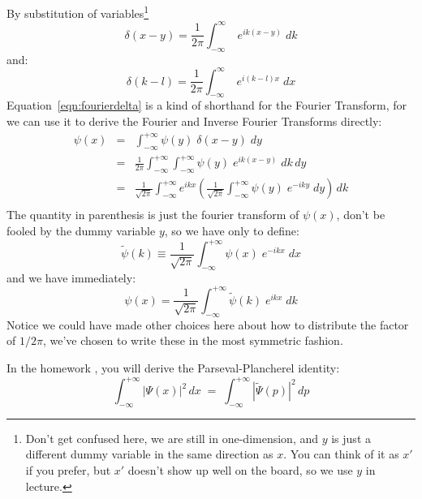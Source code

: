 \documentclass[12pt]{book}
\begin{document}
By substitution of variables\footnote{Don't get confused here, we are still in one-dimension, and $y$ is just a different dummy variable in the same direction as $x$.  You can think of it as $x'$ if you prefer, but $x'$ doesn't show up well on the board, so we use $y$ in lecture.}
$$
\delta(x-y) = \frac{1}{2\pi} \int_{-\infty}^{\infty} \; e^{ik(x-y)} \; dk
$$
and:
$$
\delta(k-l) = \frac{1}{2\pi} \int_{-\infty}^{\infty} \; e^{i(k-l)x} \; dx
$$
Equation~\ref{eqn:fourierdelta} is a kind of shorthand for the Fourier Transform, for we can use it to derive the Fourier and Inverse Fourier Transforms directly:
\begin{eqnarray*}
\psi(x) &=& \int_{-\infty}^{+\infty} \psi(y) \; \delta(x-y) \; dy \\
&=& \frac{1}{2\pi}\int_{-\infty}^{+\infty} \int_{-\infty}^{+\infty} \psi(y) \; e^{ik(x-y)} \; dk \, dy \\
&=& \frac{1}{\sqrt{2\pi}}\int_{-\infty}^{+\infty} e^{ikx} 
 \left( \frac{1}{\sqrt{2\pi}} \int_{-\infty}^{+\infty} \psi(y) \; e^{-iky} \; dy \right) \, dk \\
\end{eqnarray*}
The quantity in parenthesis is just the fourier transform of $\psi(x)$, don't be fooled by the dummy variable $y$, so we have only to define:
$$\widetilde{\psi}(k) \equiv \frac{1}{\sqrt{2\pi}} \int_{-\infty}^{+\infty} \psi(x) \; e^{-ikx} \; dx $$
and we have immediately:
$$\psi(x) = \frac{1}{\sqrt{2\pi}} \int_{-\infty}^{+\infty} \widetilde{\psi}(k) \; e^{ikx} \; dk $$
Notice we could have made other choices here about how to distribute the factor of $1/2\pi$, we've chosen to write these in the most symmetric fashion.

In the homework , you will derive the Parseval-Plancherel identity:
$$\int_{-\infty}^{+\infty} |\Psi(x)|^2 \, dx \; = \; \int_{-\infty}^{+\infty} |\widetilde{\Psi}(p)|^2 \, dp$$

\end{document}
